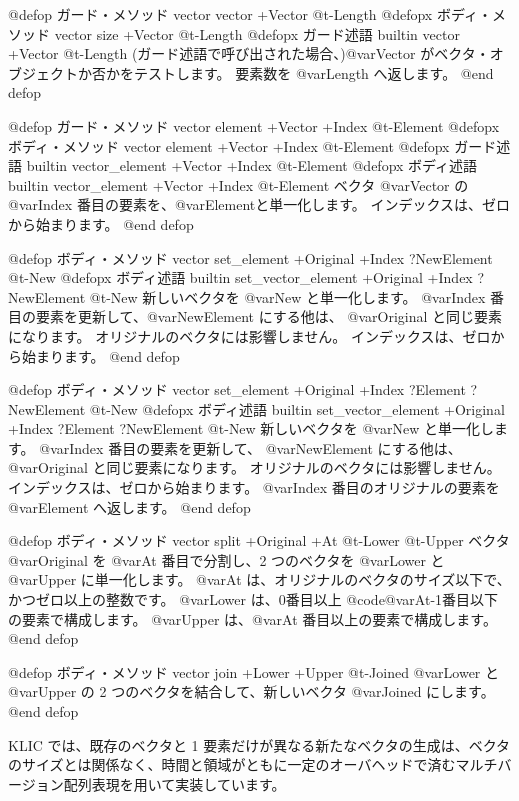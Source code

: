 {{@defop {ガード・メソッド} {vector} vector +Vector @t{-}Length
@defopx {ボディ・メソッド} {vector} size +Vector @t{-}Length
@defopx {ガード述語} {builtin} vector +Vector @t{-}Length
(ガード述語で呼び出された場合、)@var{Vector} がベクタ・オブジェクトか否かをテストします。
要素数を @var{Length} へ返します。
@end defop

@defop {ガード・メソッド} {vector} element +Vector +Index @t{-}Element
@defopx {ボディ・メソッド} {vector} element +Vector +Index @t{-}Element
@defopx {ガード述語} {builtin} vector_element +Vector +Index @t{-}Element
@defopx {ボディ述語} {builtin} vector_element +Vector +Index @t{-}Element
ベクタ @var{Vector} の @var{Index} 番目の要素を、@var{Element}と単一化します。
インデックスは、ゼロから始まります。 
@end defop

@defop {ボディ・メソッド} {vector} set_element +Original +Index ?NewElement @t{-}New
@defopx {ボディ述語} {builtin} set_vector_element +Original +Index ?NewElement @t{-}New
新しいベクタを @var{New} と単一化します。
 @var{Index} 番目の要素を更新して、@var{NewElement} にする他は、 @var{Original} と同じ要素になります。
オリジナルのベクタには影響しません。
インデックスは、ゼロから始まります。
@end defop

@defop {ボディ・メソッド} {vector} set_element +Original +Index ?Element ?NewElement @t{-}New
@defopx {ボディ述語} {builtin} set_vector_element +Original +Index ?Element ?NewElement @t{-}New
新しいベクタを @var{New} と単一化します。
 @var{Index} 番目の要素を更新して、 @var{NewElement} にする他は、 @var{Original} と同じ要素になります。
オリジナルのベクタには影響しません。
インデックスは、ゼロから始まります。
 @var{Index} 番目のオリジナルの要素を @var{Element} へ返します。
@end defop

@defop {ボディ・メソッド} {vector} split +Original +At @t{-}Lower @t{-}Upper
ベクタ @var{Original} を @var{At} 番目で分割し、2 つのベクタを @var{Lower} と @var{Upper} に単一化します。
@var{At} は、オリジナルのベクタのサイズ以下で、かつゼロ以上の整数です。
@var{Lower} は、0番目以上 @code{@var{At}-1}番目以下の要素で構成します。
@var{Upper} は、@var{At} 番目以上の要素で構成します。
@end defop

@defop {ボディ・メソッド} {vector} join +Lower +Upper @t{-}Joined
@var{Lower} と @var{Upper} の 2 つのベクタを結合して、新しいベクタ @var{Joined} にします。
@end defop

KLIC では、既存のベクタと 1 要素だけが異なる新たなベクタの生成は、ベクタのサイズとは関係なく、時間と領域がともに一定のオーバヘッドで済むマルチバージョン配列表現を用いて実装しています。

}}
